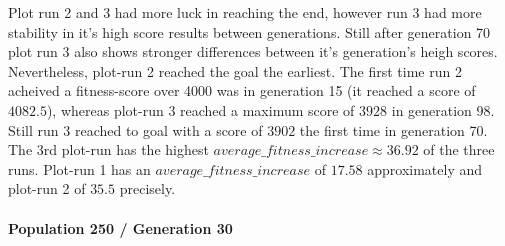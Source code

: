 			Plot run 2 and 3 had more luck in reaching the end, however run 3 had more stability in it's high score results between generations. Still after generation 70 plot run 3 also shows stronger differences between it's generation's heigh scores. Nevertheless, plot-run 2 reached the goal the earliest. The first time run 2 acheived a fitness-score over 4000 was in generation 15 (it reached a score of $4082.5$), whereas plot-run 3 reached a maximum score of $3928$ in generation 98. Still run 3 reached to goal with a score of $3902$ the first time in generation 70. The 3rd plot-run has the highest $average\_fitness\_increase\approx36.92$ of the three runs. Plot-run 1 has an $average\_fitness\_increase$ of $17.58$ approximately and plot-run 2 of $35.5$ precisely.\\
		
		
		\paragraph{Population 250 / Generation 30}
			\label{par:mario250}
